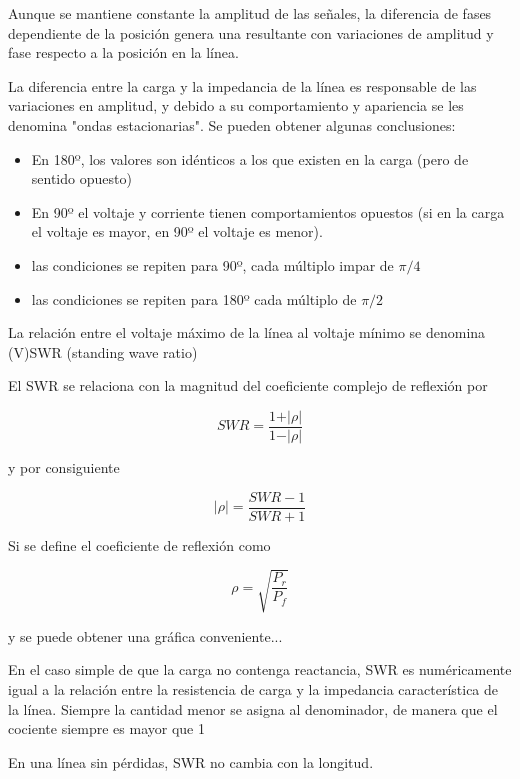 \documentclass[12pt,letterpaper,titlepage,twoside]{book}
\begin{document}
Aunque se mantiene constante la amplitud de las señales, la diferencia de fases dependiente de la posición genera una resultante con variaciones de amplitud y fase respecto a la posición en la línea.

La diferencia entre la carga y la impedancia de la línea es responsable de las variaciones en amplitud, y debido a su comportamiento y apariencia se les denomina "ondas estacionarias".
Se pueden obtener algunas conclusiones:

\begin{itemize}
\item En 180º, los valores son idénticos a los que existen en la carga (pero de sentido opuesto)
\item En 90º el voltaje y corriente tienen comportamientos opuestos (si en la carga el voltaje es mayor, en 90º el voltaje es menor).
\item las condiciones se repiten para 90º, cada múltiplo impar de $\pi/4$
\item las condiciones se repiten para 180º cada múltiplo de $\pi/2$
\end{itemize}

La relación entre el voltaje máximo de la línea al voltaje mínimo se denomina (V)SWR (standing wave ratio)

El SWR se relaciona con la magnitud del coeficiente complejo de reflexión por

\begin{equation}
SWR = \frac{1 + \vert \rho \vert }{1 - \vert \rho \vert }
\end{equation}

y por consiguiente

\begin{equation}
\vert \rho \vert =\frac{SWR -1}{SWR +1 }
\end{equation}

Si se define el coeficiente de reflexión como 

\begin{equation}
\rho = \sqrt{\frac{P_r}{P_f}}
\end{equation}

y se puede obtener una gráfica conveniente...

En el caso simple de que la carga no contenga reactancia, SWR es numéricamente igual a la relación entre la resistencia de carga y la impedancia característica de la línea. Siempre la cantidad menor se asigna al denominador, de manera que el cociente siempre es mayor que 1

En una línea sin pérdidas, SWR no cambia con la longitud.
\end{document}
